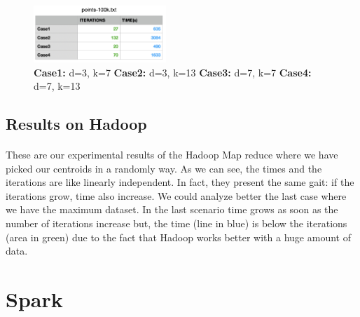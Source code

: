 \documentclass{book}
\begin{document}
    \begin{figure}[H]
        \hfill
        \hfill
        \hfill
        \includegraphics[width=5cm]{hadoop/tabella_point100k}
        \centering
        \caption{\footnotesize{\textbf{Case1:} d=3, k=7 \textbf{Case2:} d=3, k=13 \textbf{Case3:} d=7, k=7 \textbf{Case4:} d=7, k=13}}
    \end{figure}

    \subsection{Results on Hadoop}
    \paragraph{}

    These are our experimental results of the Hadoop Map reduce where we have picked our centroids in a randomly way. As we can see, the times and the iterations are like linearly independent. In fact, they present the same gait: if the iterations grow, time also increase. We could analyze better the last case where we have the maximum dataset. In the last scenario time grows as soon as the number of iterations increase but, the time (line in blue) is below the iterations (area in green) due to the fact that Hadoop works better with a huge amount of data. 

    \section{Spark}
\end{document}

